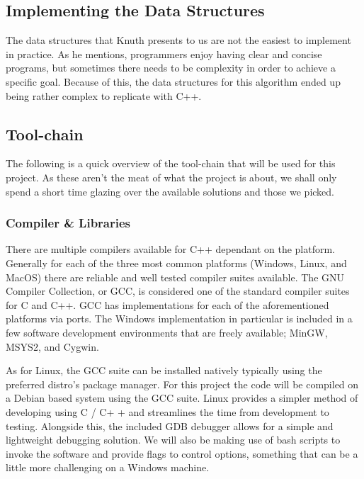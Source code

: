 \documentclass{article}
\begin{document}
\subsection{Implementing the Data Structures}

The data structures that Knuth presents to us are not the easiest to implement in practice. As he mentions, programmers enjoy having clear and concise programs, but sometimes there needs to be complexity in order to achieve a specific goal. Because of this, the data structures for this algorithm ended up being rather complex to replicate with C++.


\subsection{Tool-chain}
The following is a quick overview of the tool-chain that will be used for this project. As these aren't the meat of what the 
project is about, we shall only spend a short time glazing over the available solutions and those we picked.

\subsubsection{Compiler \& Libraries}
There are multiple compilers available for C++ dependant on the platform. Generally for each of the three most common platforms 
(Windows, Linux, and MacOS) there are reliable and well tested compiler suites available. The GNU Compiler Collection, or GCC, is
considered one of the standard compiler suites for C and C++. GCC has implementations for each of the aforementioned platforms 
via ports. The Windows implementation in particular is included in a few software development environments that are freely 
available; MinGW, MSYS2, and Cygwin.

As for Linux, the GCC suite can be installed natively typically using the preferred distro's package manager. For this project the
code will be compiled on a Debian based system using the GCC suite. Linux provides a simpler method of developing using C / C+
+ and streamlines the time from development to testing. Alongside this, the included GDB debugger allows for a simple and 
lightweight debugging solution. We will also be making use of bash scripts to invoke the software and provide flags to control 
options, something that can be a little more challenging on a Windows machine.
\end{document}
